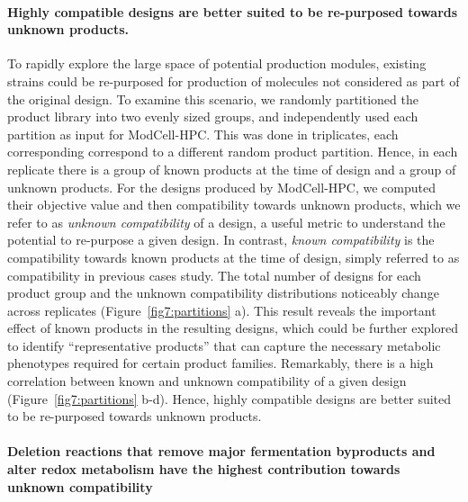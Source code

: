 \documentclass[12pt]{article}
\begin{document}
{\paragraph{Highly compatible designs are better suited to be re-purposed towards unknown products.}
To rapidly explore the large space of potential production modules, existing strains could be re-purposed for production of molecules not considered as part of the original design.
To examine this scenario,  we randomly partitioned the product library into two evenly sized groups, and independently used each partition as input for ModCell-HPC.
This was done in triplicates, each corresponding correspond to a different random product partition.
Hence, in each replicate there is a group of known products at the time of design and a group of unknown products. For the designs produced by ModCell-HPC, we computed their objective value and then compatibility towards unknown products, which we refer to as \emph{unknown compatibility} of a design, a useful metric to understand the potential to re-purpose a given design.
In contrast, \emph{known compatibility} is the compatibility towards known products at the time of design, simply referred to as compatibility in previous cases study.
The total number of designs for each product group and the unknown compatibility distributions noticeably change across replicates (Figure~\ref{fig7:partitions} a).
This result reveals the important effect of known products in the resulting designs, which could be further explored to identify ``representative products'' that can capture the necessary metabolic phenotypes required for certain product families.
Remarkably, there is a high correlation between known and unknown compatibility
of a given design (Figure~\ref{fig7:partitions} b-d).
Hence, highly compatible designs are better suited to be re-purposed towards unknown products.

\paragraph{Deletion reactions that remove major fermentation byproducts and alter redox metabolism have the highest contribution towards unknown compatibility}

}
\end{document}
